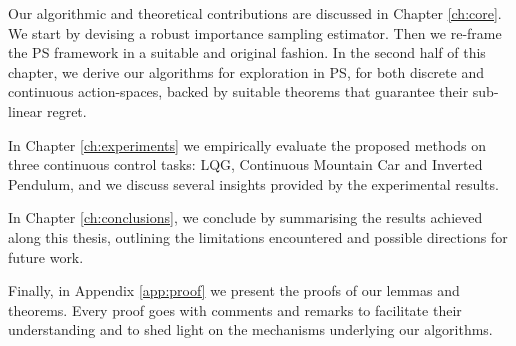 Our algorithmic and theoretical contributions are discussed in Chapter \ref{ch:core}. We start by devising a robust importance sampling estimator. Then we re-frame the \gls{PS} framework in a suitable and original fashion. In the second half of this chapter, we derive our algorithms for exploration in \gls{PS}, for both discrete and continuous action-spaces, backed by suitable theorems that guarantee their sub-linear regret.

In Chapter \ref{ch:experiments} we empirically evaluate the proposed methods on three continuous control tasks: \gls{LQG}, Continuous Mountain Car and Inverted Pendulum, and we discuss several insights provided by the experimental results.

In Chapter \ref{ch:conclusions}, we conclude by summarising the results achieved along this thesis, outlining the limitations encountered and possible directions for future work.

Finally, in Appendix \ref{app:proof} we present the proofs of our lemmas and theorems. Every proof goes with comments and remarks to facilitate their understanding and to shed light on the mechanisms underlying our algorithms. 
